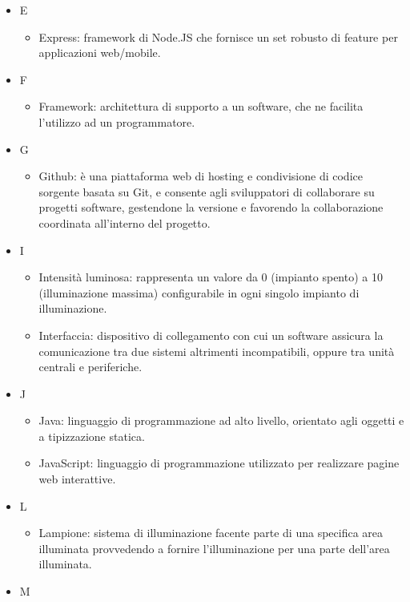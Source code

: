 \documentclass[12pt]{article}
\begin{document}
\begin{itemize}
    \item[] E
    \begin{itemize}
        \item Express: framework di Node.JS che fornisce un set robusto di feature per applicazioni web/mobile.
    \end{itemize}
    \item[] F
    \begin{itemize}
        \item Framework: architettura di supporto a un software, che ne facilita l’utilizzo ad un programmatore.
    \end{itemize}
    \item[] G
    \begin{itemize}
        \item Github: è una piattaforma web di hosting e condivisione di codice sorgente basata su Git, e consente agli sviluppatori di collaborare su progetti software, gestendone la versione e favorendo la collaborazione coordinata all’interno del progetto.
    \end{itemize}
    \item[] I
    \begin{itemize}
        \item Intensità luminosa: rappresenta un valore da 0 (impianto spento) a 10 (illuminazione massima) configurabile in ogni singolo impianto di illuminazione.
        \item Interfaccia: dispositivo di collegamento con cui un software assicura la comunicazione tra due sistemi altrimenti incompatibili, oppure tra unità centrali e periferiche.    
    \end{itemize}
    \item[] J
    \begin{itemize}
        \item Java: linguaggio di programmazione ad alto livello, orientato agli oggetti e a tipizzazione statica.
        \item JavaScript: linguaggio di programmazione utilizzato per realizzare pagine web interattive.
    \end{itemize}
    \item[] L
    \begin{itemize}
        \item Lampione: sistema di illuminazione facente parte di una specifica area illuminata provvedendo a fornire l’illuminazione per una parte dell’area illuminata.
    \end{itemize}
    \item[] M

\end{itemize}
\end{document}
